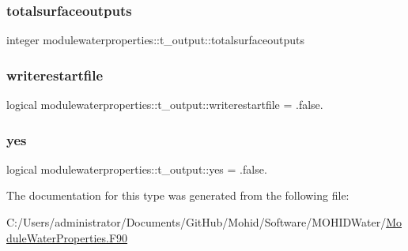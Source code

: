 \subsubsection{\texorpdfstring{totalsurfaceoutputs}{totalsurfaceoutputs}}
{\footnotesize\ttfamily integer modulewaterproperties\+::t\+\_\+output\+::totalsurfaceoutputs\hspace{0.3cm}{\ttfamily [private]}}

\mbox{\label{structmodulewaterproperties_1_1t__output_a060a807c25b3170addcffae82aad0f03}} 
\subsubsection{\texorpdfstring{writerestartfile}{writerestartfile}}
{\footnotesize\ttfamily logical modulewaterproperties\+::t\+\_\+output\+::writerestartfile = .false.\hspace{0.3cm}{\ttfamily [private]}}

\mbox{\label{structmodulewaterproperties_1_1t__output_a5ab9fada26018b4e60ab9c15725b64e5}} 
\subsubsection{\texorpdfstring{yes}{yes}}
{\footnotesize\ttfamily logical modulewaterproperties\+::t\+\_\+output\+::yes = .false.\hspace{0.3cm}{\ttfamily [private]}}



The documentation for this type was generated from the following file\+:\begin{DoxyCompactItemize}
\item 
C\+:/\+Users/administrator/\+Documents/\+Git\+Hub/\+Mohid/\+Software/\+M\+O\+H\+I\+D\+Water/\mbox{\hyperlink{_module_water_properties_8_f90}{Module\+Water\+Properties.\+F90}}\end{DoxyCompactItemize}
